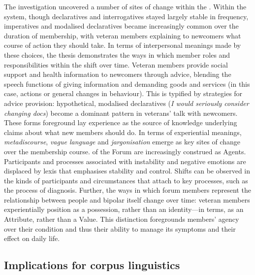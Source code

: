 The investigation uncovered a number of  sites of change within the . Within the  system, though declaratives and interrogatives stayed largely stable in frequency, imperatives and modalised declaratives became increasingly common over the duration of membership, with veteran \glspl{member} explaining to newcomers what course of action they should take. In terms of interpersonal meanings made by these  choices, the thesis demonstrates the ways in which member roles and responsibilities within the  shift over time. Veteran \glspl{member} provide social support and health information to newcomers through advice, blending the speech functions of giving information and demanding goods and services (in this case, actions or general changes in behaviour). This is typified by strategies for advice provision: hypothetical, modalised declaratives (\emph{I would seriously consider changing docs}) become a dominant pattern in veterans' talk with newcomers. These forms foreground lay experience as the source of knowledge underlying claims about what new \glspl{member} should do. In terms of experiential meanings, \emph{metadiscourse}, \emph{vague language} and \emph{jargonisation} emerge as key sites of change over the membership course.  of the \gls{Forum}  are increasingly construed as Agents. Participants and processes associated with instability and negative emotions are displaced by lexis that emphasises stability and control. Shifts can be observed in the kinds of participants and circumstances that attach to key processes, such as the process of diagnosis. Further, the ways in which \gls{forum} \glspl{member} represent the relationship between people and \gls{bipolar} itself change over time: veteran \glspl{member} experientially position  as a possession, rather than an identity---in  terms, as an Attribute, rather than a Value. This distinction foregrounds \glspl{member}' agency over their condition and thus their ability to manage its symptoms and their effect on daily life.


\subsection{Implications for corpus linguistics}

